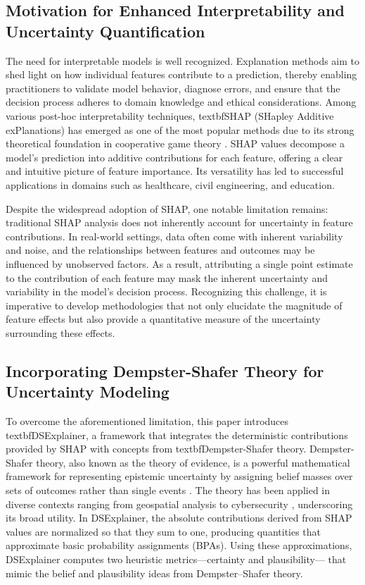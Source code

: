 \documentclass[acmlarge]{acmart}
\begin{document}
\subsection{Motivation for Enhanced Interpretability and Uncertainty Quantification}
The need for interpretable models is well recognized. Explanation methods aim to shed light on how individual features contribute to a prediction, thereby enabling practitioners to validate model behavior, diagnose errors, and ensure that the decision process adheres to domain knowledge and ethical considerations. Among various post-hoc interpretability techniques, textbf{SHAP (SHapley Additive exPlanations)} has emerged as one of the most popular methods due to its strong theoretical foundation in cooperative game theory \cite{lundberg2017unified}. SHAP values decompose a model's prediction into additive contributions for each feature, offering a clear and intuitive picture of feature importance. Its versatility has led to successful applications in domains such as healthcare\cite{nohara2022explanation,ogami2021artificial}, civil engineering\cite{ekanayake2022novel}, and education\cite{sahlaoui2021predicting}.

Despite the widespread adoption of SHAP, one notable limitation remains: traditional SHAP analysis does not inherently account for uncertainty in feature contributions. In real-world settings, data often come with inherent variability and noise, and the relationships between features and outcomes may be influenced by unobserved factors. As a result, attributing a single point estimate to the contribution of each feature may mask the inherent uncertainty and variability in the model's decision process. Recognizing this challenge, it is imperative to develop methodologies that not only elucidate the magnitude of feature effects but also provide a quantitative measure of the uncertainty surrounding these effects.

\subsection{Incorporating Dempster-Shafer Theory for Uncertainty Modeling}
To overcome the aforementioned limitation, this paper introduces textbf{DSExplainer}, a framework that integrates the deterministic contributions provided by SHAP with concepts from textbf{Dempster-Shafer theory}. Dempster-Shafer theory, also known as the theory of evidence, is a powerful mathematical framework for representing epistemic uncertainty by assigning belief masses over sets of outcomes rather than single events \cite{shafer1976mathematical}. The theory has been applied in diverse contexts ranging from geospatial analysis \cite{park2011dempster} to cybersecurity \cite{tian2020deep}, underscoring its broad utility. In DSExplainer, the absolute contributions derived from SHAP values are normalized so that they sum to one, producing quantities that approximate basic probability assignments (BPAs). Using these approximations, DSExplainer computes two heuristic metrics—certainty and plausibility— that mimic the belief and plausibility ideas from Dempster--Shafer theory.
\end{document}
